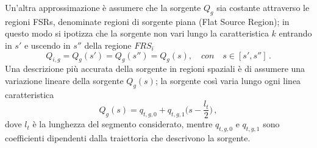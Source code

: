 Un'altra approssimazione è assumere che la sorgente $Q_g$ sia costante 
attraverso le regioni FSRs, denominate regioni di sorgente piana (Flat Source 
Region); in questo modo si ipotizza che la sorgente non vari lungo la 
caratteristica $k$ entrando in $s'$ e uscendo in $s''$ della regione $FRS_i$
\begin{equation}
Q_{i,g}=Q_g(s')=Q_g(s'')=Q_g(s), \quad con \quad s \in [s',s''] \,.
\end{equation} 
Una descrizione più accurata della sorgente in regioni spaziali è di assumere 
una variazione lineare della sorgente $Q_g(s)$; la sorgente così varia lungo 
ogni linea caratteristica
\begin{equation}
Q_g(s)=q_{t,g,0}+q_{t,g,1}\biggl(s-\frac{l_t}{2}\biggr) \,,
\end{equation}
dove $l_t$ è la lunghezza del segmento considerato, mentre $q_{t,g,0}$ e 
$q_{t,g,1}$ sono coefficienti dipendenti dalla traiettoria che descrivono la 
sorgente.

